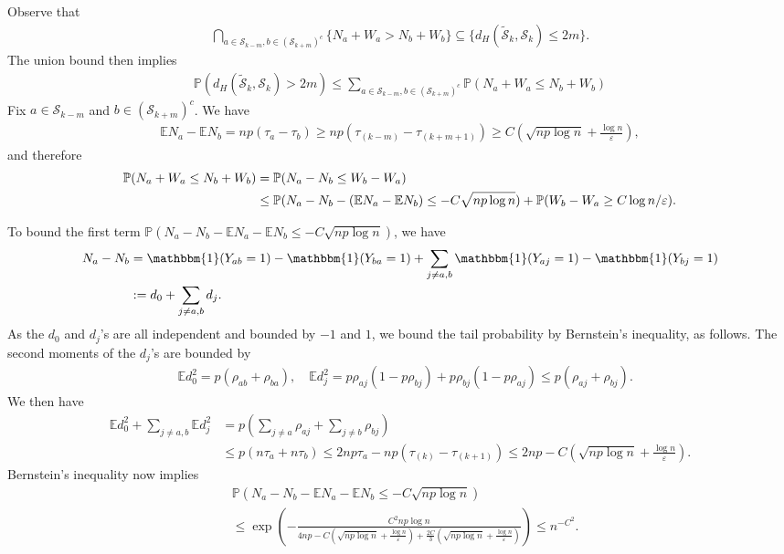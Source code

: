\documentclass[letterpaper,12pt]{article}
\numberwithin{equation}{section}
\theoremstyle{plain}
\numberwithin{Theorem}{section}
\numberwithin{corollary}{section}
\numberwithin{proposition}{section}
\numberwithin{Lemma}{section}
{
	\theoremstyle{definition}
	\newtheorem{Definition}{Definition}
	\newtheorem{example}{Example}
	\numberwithin{example}{section}
	\newtheorem{fact}{Fact}
	\numberwithin{fact}{section}
	\newtheorem{remark}{Remark}
}
\newcommand{\Pro}{\mathbb{P}}
\newcommand{\1}{\mathbbm{1}}
\def\E{\mathbb{E}}
\begin{document}
Observe that 
\begin{align*}
	\bigcap_{a \in \mathcal S_{k-m}, b \in (\mathcal S_{k+m})^c }\{N_a + W_a > N_b + W_b\} \subseteq \{d_H(\widetilde {\mathcal S}_k, \mathcal S_k) \leq  2m\}.
\end{align*}
The union bound then implies
\begin{align}
	\Pro(d_H(\widetilde {\mathcal S}_k, \mathcal S_k) >  2m) \leq \sum_{a \in \mathcal S_{k-m}, b \in (\mathcal S_{k+m})^c} \Pro(N_a + W_a \leq N_b + W_b) \label{eq: ranking nonparametric upper bound expansion 1}
\end{align}
Fix $a \in \mathcal S_{k-m}$ and $b \in (\mathcal S_{k+m})^c$. We have 
\begin{align*}
	\E N_a - \E N_b = np(\tau_a - \tau_b) \geq np(\tau_{(k-m)} - \tau_{(k+m+1)}) \geq C\left(\sqrt{np\log n} + \frac{\log n}{\varepsilon}\right),
\end{align*}
and therefore
\begin{align}
	\Pro(N_a + W_a \leq N_b + W_b) &= \Pro(N_a - N_b \leq W_b - W_a) \notag\\
	&\leq \Pro(N_a - N_b - (\E N_a - \E N_b) \leq -C\sqrt{np\log n}) + \Pro(W_b-W_a \geq C\log n/\varepsilon) \label{eq: ranking nonparametric upper bound expansion 2}.
\end{align}

To bound the first term $\Pro(N_a - N_b - \E N_a - \E N_b \leq -C\sqrt{np\log n})$, we have
\begin{align*}
	N_a - N_b &= \1(Y_{ab} = 1) - \1(Y_{ba} = 1) + \sum_{j \neq a, b} \1(Y_{aj} = 1) - \1(Y_{bj} = 1) \\
	&:= d_0 + \sum_{j \neq a, b} d_j.
\end{align*}
As the $d_0$ and $d_j$'s are all independent and bounded by $-1$ and $1$, we bound the tail probability by Bernstein's inequality, as follows. The second moments of the $d_j$'s are bounded by
\begin{align*}
	&\E d_0^2 = p(\rho_{ab} + \rho_{ba}), \quad \E d_j^2 = p\rho_{aj}(1-p\rho_{bj}) + p\rho_{bj}(1-p\rho_{aj}) \leq p(\rho_{aj} + \rho_{bj}).
\end{align*}
We then have
\begin{align*}
	\E d_0^2 + \sum_{j \neq a, b} \E d_j^2 &= p \left(\sum_{j \neq a} \rho_{aj} + \sum_{j \neq b} \rho_{bj}\right)\\
	&\leq p(n\tau_a + n\tau_b) \leq 2np\tau_a - np(\tau_{(k)} - \tau_{(k+1)}) \leq 2np - C\left(\sqrt{np\log n} + \frac{\log n}{\varepsilon}\right).
\end{align*}
Bernstein's inequality now implies
\begin{align*}
	&\Pro(N_a - N_b - \E N_a - \E N_b \leq -C\sqrt{np\log n}) \\
	&\leq \exp\left(-\frac{C^2np\log n}{4np - C\left(\sqrt{np\log n} + \frac{\log n}{\varepsilon}\right) + \frac{2C}{3}\left(\sqrt{np\log n} + \frac{\log n}{\varepsilon}\right)}\right) \leq n^{-C^2}.
\end{align*}
\end{document}
